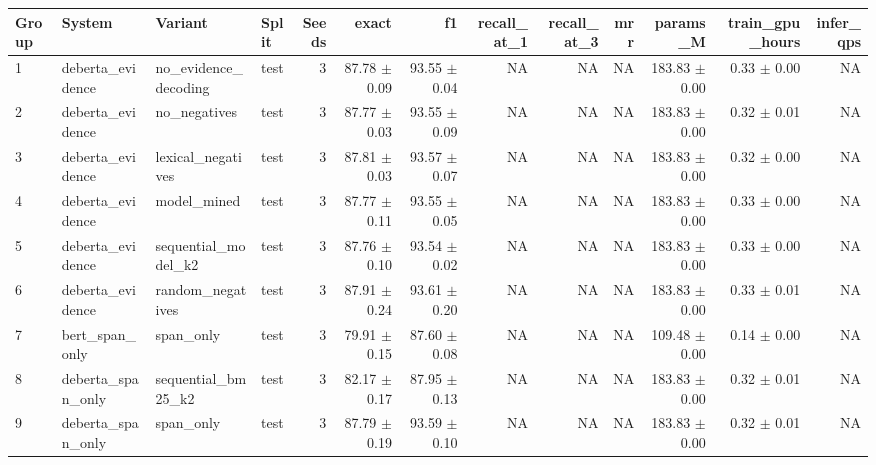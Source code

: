 \begin{tabular}{llllrrrrrrrrr}
\hline
Group & System & Variant & Split & Seeds & exact & f1 & recall\_at\_1 & recall\_at\_3 & mrr & params\_M & train\_gpu\_hours & infer\_qps \\
\hline
1 & deberta\_evidence & no\_evidence\_decoding & test & 3 & 87.78 $\pm$ 0.09 & 93.55 $\pm$ 0.04 & NA & NA & NA & 183.83 $\pm$ 0.00 & 0.33 $\pm$ 0.00 & NA \\
2 & deberta\_evidence & no\_negatives & test & 3 & 87.77 $\pm$ 0.03 & 93.55 $\pm$ 0.09 & NA & NA & NA & 183.83 $\pm$ 0.00 & 0.32 $\pm$ 0.01 & NA \\
3 & deberta\_evidence & lexical\_negatives & test & 3 & 87.81 $\pm$ 0.03 & 93.57 $\pm$ 0.07 & NA & NA & NA & 183.83 $\pm$ 0.00 & 0.32 $\pm$ 0.00 & NA \\
4 & deberta\_evidence & model\_mined & test & 3 & 87.77 $\pm$ 0.11 & 93.55 $\pm$ 0.05 & NA & NA & NA & 183.83 $\pm$ 0.00 & 0.33 $\pm$ 0.00 & NA \\
5 & deberta\_evidence & sequential\_model\_k2 & test & 3 & 87.76 $\pm$ 0.10 & 93.54 $\pm$ 0.02 & NA & NA & NA & 183.83 $\pm$ 0.00 & 0.33 $\pm$ 0.00 & NA \\
6 & deberta\_evidence & random\_negatives & test & 3 & 87.91 $\pm$ 0.24 & 93.61 $\pm$ 0.20 & NA & NA & NA & 183.83 $\pm$ 0.00 & 0.33 $\pm$ 0.01 & NA \\
7 & bert\_span\_only & span\_only & test & 3 & 79.91 $\pm$ 0.15 & 87.60 $\pm$ 0.08 & NA & NA & NA & 109.48 $\pm$ 0.00 & 0.14 $\pm$ 0.00 & NA \\
8 & deberta\_span\_only & sequential\_bm25\_k2 & test & 3 & 82.17 $\pm$ 0.17 & 87.95 $\pm$ 0.13 & NA & NA & NA & 183.83 $\pm$ 0.00 & 0.32 $\pm$ 0.01 & NA \\
9 & deberta\_span\_only & span\_only & test & 3 & 87.79 $\pm$ 0.19 & 93.59 $\pm$ 0.10 & NA & NA & NA & 183.83 $\pm$ 0.00 & 0.32 $\pm$ 0.01 & NA \\
\hline
\end{tabular}
